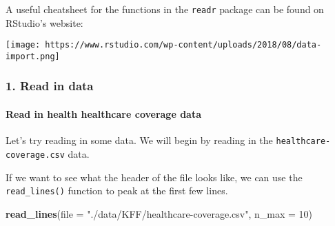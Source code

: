 \documentclass[]{article}
\newenvironment{Shaded}{\begin{snugshade}}{\end{snugshade}}
\newcommand{\DataTypeTok}[1]{\textcolor[rgb]{0.13,0.29,0.53}{#1}}
\newcommand{\DecValTok}[1]{\textcolor[rgb]{0.00,0.00,0.81}{#1}}
\newcommand{\KeywordTok}[1]{\textcolor[rgb]{0.13,0.29,0.53}{\textbf{#1}}}
\newcommand{\NormalTok}[1]{#1}
\newcommand{\StringTok}[1]{\textcolor[rgb]{0.31,0.60,0.02}{#1}}
\let\oldparagraph\paragraph
\renewcommand{\paragraph}[1]{\oldparagraph{#1}\mbox{}}
\begin{document}
A useful cheatsheet for the functions in the \texttt{readr} package can
be found on RStudio's website:

\texttt{[image: https://www.rstudio.com/wp-content/uploads/2018/08/data-import.png]}

\hypertarget{read-in-data}{%
\subsubsection{1. Read in data}\label{read-in-data}}

\hypertarget{read-in-health-healthcare-coverage-data}{%
\paragraph{Read in health healthcare coverage
data}\label{read-in-health-healthcare-coverage-data}}

Let's try reading in some data. We will begin by reading in the
\texttt{healthcare-coverage.csv} data.

If we want to see what the header of the file looks like, we can use the
\texttt{read\_lines()} function to peak at the first few lines.

\begin{Shaded}
\begin{Highlighting}[]
\KeywordTok{read_lines}\NormalTok{(}\DataTypeTok{file =} \StringTok{"./data/KFF/healthcare-coverage.csv"}\NormalTok{, }\DataTypeTok{n_max =} \DecValTok{10}\NormalTok{)}
\end{Highlighting}
\end{Shaded}
\end{document}
